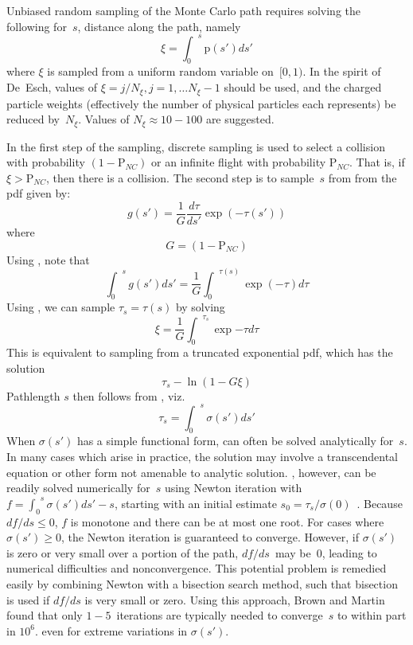 Unbiased random sampling of the Monte Carlo path requires solving the
following for~$s$, distance along the path, 
namely
\begin{equation}\label{eq:xisamp}
\xi = {\int_0}^s \mathrm{p}(s')ds'
\end{equation}
where $\xi$ is sampled from a uniform random variable on~$[0,1)$. In the
spirit of
De~Esch, values of $\xi= j/N_{\xi}, j=1, \ldots N_{\xi}-1$ should be used,
and the charged particle weights (effectively the number of physical
particles each represents) be reduced by~$N_{\xi}$. Values of $N_{\xi} \approx
10-100$ are suggested.
 
In the first step of the sampling, discrete sampling is used to select a collision with probability $(1-\mathrm{P}_{NC})$
or an infinite flight with probability $\mathrm{P}_{NC}$. That is, 
if $\xi > \mathrm{P}_{NC}$, 
then there is a collision. The second step is to sample~$s$ from 
 from the pdf given by:
\begin{equation}\label{eq:partpdf}
g(s')=\frac{1}{G} \frac{d \tau}{d s'}\exp{(-\tau(s'))}
\end{equation}
where
\begin{equation}\label{eq:GPNC}
G= (1-\mathrm{P}_{NC})
\end{equation}
Using , note that 
\begin{equation}\label{eq:gconstr}
{\int_0}^s g(s')ds' = \frac{1}{G} {\int_0}^{\tau(s)} \exp{(-\tau)}d\tau
\end{equation}
Using , we can sample $\tau_s=\tau(s)$ by solving 
\begin{equation}\label{eq:xiG}
\xi=\frac{1}{G} {\int_0}^{\tau_s} \exp{-\tau}d\tau
\end{equation}
This is equivalent to sampling from a truncated exponential pdf, which has 
the solution 
\begin{equation}\label{eq:xiGsoln}
\tau_s -\ln(1-G\xi)
\end{equation}
Pathlength $s$ then follows from , viz.
\begin{equation} \label{eq:sfromtau}
\tau_s ={\int_0}^s \sigma(s') ds'
\end{equation}
When $\sigma(s')$ has a simple functional form,  can often be solved analytically for~$s$. In many 
cases which arise in practice, the solution may involve a transcendental equation or other form 
not amenable to analytic solution. , however, can be readily solved numerically for~$s$ 
using Newton iteration with $f= {\int_0}^s \sigma(s') ds' -s$,
starting with an initial estimate $s_0 = \tau_s/\sigma(0)$~\cite{Br03Dire}. 
Because $df/ds\le 0$, $f$ is monotone and there can be at most one root.
For cases where $\sigma(s')\ge 0$,
the Newton iteration is guaranteed to 
converge. However, if $\sigma(s')$ is zero or very small over a portion of the path, $df/ds$~may be~$0$,
leading to numerical difficulties and nonconvergence. This potential problem is 
remedied easily by combining Newton with a bisection search method, such that
bisection is used if $df/ds$ is very small or zero. Using this approach, Brown
and Martin 
found that only $1-5$~iterations are typically needed to converge~$s$ to within
part in $10^6$.
even for extreme variations in $\sigma(s')$. 

